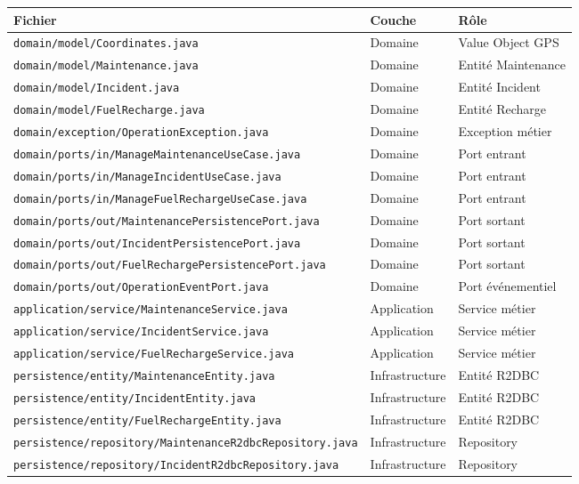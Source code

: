 \documentclass[12pt,a4paper]{report}
\begin{document}
\begin{longtable}{p{7cm}p{2cm}p{4cm}}
\toprule
\textbf{Fichier} & \textbf{Couche} & \textbf{Rôle} \\
\midrule
\endhead
\texttt{domain/model/Coordinates.java} & Domaine & Value Object GPS \\
\texttt{domain/model/Maintenance.java} & Domaine & Entité Maintenance \\
\texttt{domain/model/Incident.java} & Domaine & Entité Incident \\
\texttt{domain/model/FuelRecharge.java} & Domaine & Entité Recharge \\
\texttt{domain/exception/OperationException.java} & Domaine & Exception métier \\
\texttt{domain/ports/in/ManageMaintenanceUseCase.java} & Domaine & Port entrant \\
\texttt{domain/ports/in/ManageIncidentUseCase.java} & Domaine & Port entrant \\
\texttt{domain/ports/in/ManageFuelRechargeUseCase.java} & Domaine & Port entrant \\
\texttt{domain/ports/out/MaintenancePersistencePort.java} & Domaine & Port sortant \\
\texttt{domain/ports/out/IncidentPersistencePort.java} & Domaine & Port sortant \\
\texttt{domain/ports/out/FuelRechargePersistencePort.java} & Domaine & Port sortant \\
\texttt{domain/ports/out/OperationEventPort.java} & Domaine & Port événementiel \\
\texttt{application/service/MaintenanceService.java} & Application & Service métier \\
\texttt{application/service/IncidentService.java} & Application & Service métier \\
\texttt{application/service/FuelRechargeService.java} & Application & Service métier \\
\texttt{persistence/entity/MaintenanceEntity.java} & Infrastructure & Entité R2DBC \\
\texttt{persistence/entity/IncidentEntity.java} & Infrastructure & Entité R2DBC \\
\texttt{persistence/entity/FuelRechargeEntity.java} & Infrastructure & Entité R2DBC \\
\texttt{persistence/repository/MaintenanceR2dbcRepository.java} & Infrastructure & Repository \\
\texttt{persistence/repository/IncidentR2dbcRepository.java} & Infrastructure & Repository \\

\end{longtable}
\end{document}
